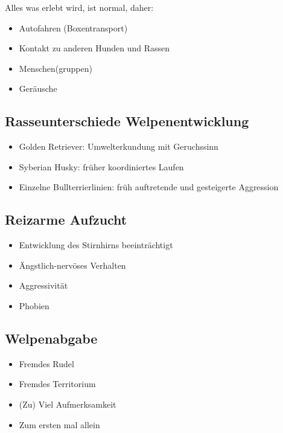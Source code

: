         Alles was erlebt wird, ist \glqq normal\grqq, daher:
        \begin{itemize}
            \item Autofahren (Boxentransport)
            \item Kontakt zu anderen Hunden und Rassen
            \item Menschen(gruppen)
            \item Geräusche
        \end{itemize}

    \subsection{Rasseunterschiede Welpenentwicklung}
        \begin{itemize}
            \item Golden Retriever: Umwelterkundung mit Geruchssinn
            \item Syberian Husky: früher koordiniertes Laufen
            \item Einzelne Bullterrierlinien: früh auftretende und gesteigerte Aggression
        \end{itemize}

    \subsection{Reizarme Aufzucht}
        \begin{itemize}
            \item Entwicklung des Stirnhirns beeinträchtigt
            \item Ängstlich-nervöses Verhalten
            \item Aggressivität
            \item Phobien
        \end{itemize}

    \subsection{Welpenabgabe}
        \begin{itemize}
            \item Fremdes \glqq Rudel\grqq
            \item Fremdes Territorium
            \item (Zu) Viel Aufmerksamkeit
            \item Zum ersten mal allein
        \end{itemize}



